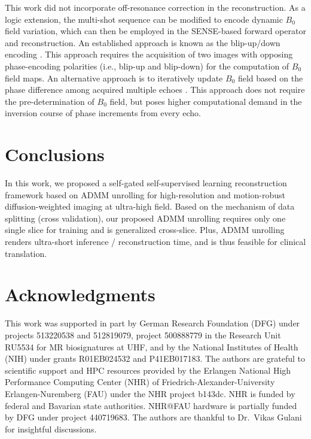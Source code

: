\documentclass[AMA,STIX2COL,Linenumberson]{MRM}
\begin{document}
This work did not incorporate off-resonance correction in the reconstruction.
As a logic extension, the multi-shot sequence can be modified
to encode dynamic $B_0$ field variation, which can then be employed in the SENSE-based forward operator and reconstruction. An established approach
is known as the blip-up/down encoding \cite{zahneisen_2017_blipud}.
This approach requires the acquisition of two images
with opposing phase-encoding polarities (i.e., blip-up and blip-down)
for the computation of $B_0$ field maps.
An alternative approach is to iteratively update $B_0$ field
based on the phase difference among acquired multiple echoes \cite{tan_2023_meco}.
This approach does not require the pre-determination of $B_0$ field,
but poses higher computational demand in the inversion course of phase increments
from every echo.

\section{Conclusions}\label{SEC:CONCL}

In this work, we proposed a self-gated self-supervised learning
reconstruction framework based on ADMM unrolling
for high-resolution and motion-robust diffusion-weighted imaging
at ultra-high field.
Based on the mechanism of data splitting (cross validation),
our proposed ADMM unrolling requires only one single slice for training
and is generalized cross-slice.
Plus, ADMM unrolling renders ultra-short inference / reconstruction time,
and is thus feasible for clinical translation.

\section*{Acknowledgments}
This work was supported in part by
German Research Foundation (DFG)
under projects 513220538 and 512819079,
project 500888779 in the Research Unit RU5534
for MR biosignatures at UHF,
and by the National Institutes of Health (NIH)
under grants R01EB024532 and P41EB017183.
The authors are grateful to scientific support and HPC resources
provided by
the Erlangen National High Performance Computing Center (NHR)
of Friedrich-Alexander-University Erlangen-Nuremberg (FAU)
under the NHR project b143dc.
NHR is funded by federal and Bavarian state authorities.
NHR@FAU hardware is partially funded by
DFG under project 440719683. 
The authors are thankful to Dr.~Vikas Gulani for insightful discussions.
\end{document}
